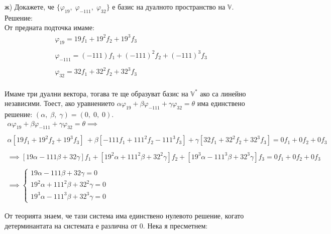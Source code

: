 \documentclass[12pt]{article}
\newcommand{\V}{\mathbb{V}}
\begin{document}
ж) Докажете, че $\{\varphi_{19}, \; \varphi_{-111}, \; \varphi_{32}\}$ е базис на дуалното пространство на $\V$. \\

Решение: \\

От предната подточка имаме: \\

\begin{align*}
    \varphi_{19} = 19f_1 + 19^2f_2 + 19^3f_3 \\\\
    \varphi_{-111} = (-111)f_1 + (-111)^2f_2 + (-111)^3f_3 \\\\
    \varphi_{32} = 32f_1 + 32^2f_2 + 32^3f_3
\end{align*} \\

Имаме три дуални вектора, тогава те ще образуват базис на $\V^*$ ако са линейно независими.
Тоест, ако уравнението $\alpha \varphi_{19} + \beta \varphi_{-111} + \gamma \varphi_{32} = \theta$ има единствено решение:
$(\alpha, \; \beta, \; \gamma) = (0, \; 0, \; 0)$. \\

\begin{align*}
    \alpha \varphi_{19} + \beta \varphi_{-111} + \gamma \varphi_{32} = \theta \implies \\\\
    \alpha[19f_1 + 19^2f_2 + 19^3f_3]\
    + \beta[-111f_1 + 111^2f_2 - 111^3f_3]
    + \gamma[32f_1 + 32^2f_2 + 32^3f_3]
    = 0f_1 + 0f_2 + 0f_3 \\\\
    \implies [19\alpha - 111 \beta + 32 \gamma]f_1
    + [19^2\alpha + 111^2\beta + 32^2 \gamma]f_2
    + [19^3\alpha - 111^3\beta + 32^3 \gamma]f_3
    = 0f_1 + 0f_2 + 0f_3 \\\\
    \implies \begin{cases}
        19\alpha - 111 \beta + 32 \gamma = 0 \\
        19^2\alpha + 111^2\beta + 32^2 \gamma = 0 \\
        19^3\alpha - 111^3\beta + 32^3 \gamma = 0
    \end{cases}
\end{align*}

От теорията знаем, че тази система има единствено нулевото решение, когато детерминантата на системата е различна от $0$.
Нека я пресметнем: \\
\end{document}
